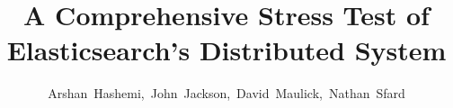 \documentclass[journal]{IEEEtran}
\begin{document}
%
\title{A Comprehensive Stress Test of Elasticsearch's Distributed System}

%
%
%

\author{Arshan~Hashemi,~John~Jackson,~David~Maulick,~Nathan~Sfard}

% 
%



%
% 




\end{document}
